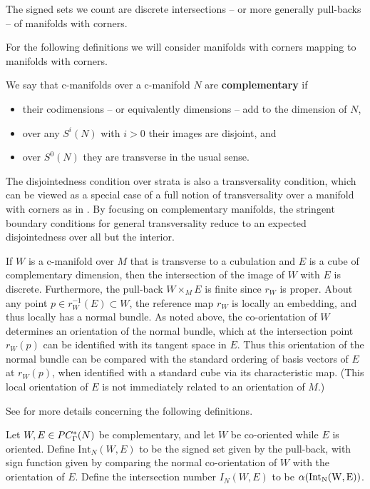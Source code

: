 The signed sets we count are discrete intersections -- or more generally pull-backs -- of manifolds with corners.

For the following definitions we will consider manifolds with corners mapping to manifolds with corners.


\begin{definition}
	We say that c-manifolds over a c-manifold $N$ are \textbf{complementary} if
	\begin{itemize}
		\item their codimensions -- or equivalently dimensions -- add to the dimension of $N$,
		\item over any $S^i(N)$ with $i>0$ their images are disjoint, and
		\item over $S^0(N)$ they are transverse in the usual sense.
	\end{itemize}
\end{definition}

The disjointedness condition over strata is also a transversality condition, which can be viewed as a special case of a full notion of transversality over a manifold with corners as in \cite{Joy12}.
By focusing on complementary manifolds, the stringent boundary conditions for general transversality reduce to an expected disjointedness over all but the interior.

If $W$ is a c-manifold over $M$ that is transverse to a cubulation and $E$ is a cube of complementary dimension, then the intersection of the image of $W$ with $E$ is discrete.
Furthermore, the pull-back $W \times_M E$ is finite since $r_W$ is proper.
About any point $p \in r_W^{-1}(E) \subset W$, the reference map $r_W$ is locally an embedding, and thus locally has a normal bundle.
As noted above, the co-orientation of $W$ determines an orientation of the normal bundle, which at the intersection point $r_W(p)$ can be identified with its tangent space in $E$.
Thus this orientation of the normal bundle can be compared with the standard ordering of basis vectors of $E$ at $r_W(p)$, when identified with a standard cube via its characteristic map.
(This local orientation of $E$ is not immediately related to an orientation of $M$.)

See \cite[Section 6.5]{medina2022foundations} for more details concerning the following definitions.

\begin{definition}\label{D:intersection number}
	Let $W, E \in PC_\Gamma^*({N})$ be complementary, and let $W$ be co-oriented while $E$ is oriented. Define $\mathrm{Int}_N(W, E)$ to be the signed set given
	by the pull-back, with sign function given by comparing the normal co-orientation of $W$ with the orientation of $E$.
	Define the intersection number $I_N(W,E)$ to be $\alpha(\rm{Int}_N(W, E))$.
\end{definition}

